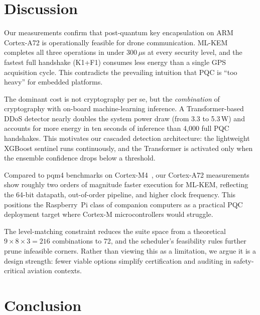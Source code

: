 \documentclass[conference]{IEEEtran}
\begin{document}
\section{Discussion}
\label{sec:disc}

Our measurements confirm that post-quantum key encapsulation on
ARM Cortex-A72 is operationally feasible for drone communication.
ML-KEM completes all three operations in under 300\,$\mu$s at every
security level, and the fastest full handshake (K1+F1) consumes
less energy than a single GPS acquisition cycle.  This contradicts
the prevailing intuition that PQC is ``too heavy'' for embedded
platforms.

The dominant cost is not cryptography per se, but the
\emph{combination} of cryptography with on-board machine-learning
inference.  A Transformer-based DDoS detector nearly doubles the
system power draw (from 3.3 to 5.3\,W) and accounts for more energy
in ten seconds of inference than 4{,}000 full PQC handshakes.  This
motivates our cascaded detection architecture: the lightweight XGBoost
sentinel runs continuously, and the Transformer is activated only when
the ensemble confidence drops below a threshold.

Compared to pqm4 benchmarks on Cortex-M4~\cite{drone-pqc-analysis},
our Cortex-A72 measurements show roughly two orders of magnitude
faster execution for ML-KEM, reflecting the 64-bit datapath, out-of-order
pipeline, and higher clock frequency.  This positions the
Raspberry~Pi class of companion computers as a practical PQC
deployment target where Cortex-M microcontrollers would struggle.

The level-matching constraint reduces the suite space from a
theoretical $9 \times 8 \times 3 = 216$ combinations to 72, and the
scheduler's feasibility rules further prune infeasible corners.
Rather than viewing this as a limitation, we argue it is a design
strength: fewer viable options simplify certification and auditing in
safety-critical aviation contexts.


\section{Conclusion}
\label{sec:conc}
\end{document}
